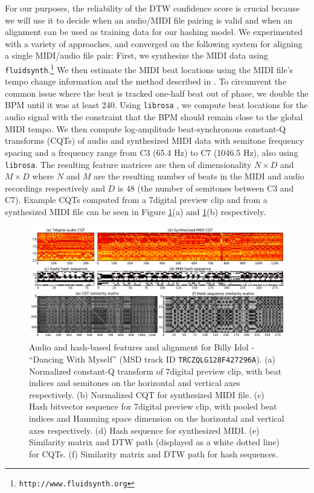 \documentclass{article}
\begin{document}
For our purposes, the reliability of the DTW confidence score is crucial because we will use it to decide when an audio/MIDI file pairing is valid and when an alignment can be used as training data for our hashing model.
We experimented with a variety of approaches, and converged on the following system for aligning a single MIDI/audio file pair:
First, we synthesize the MIDI data using \texttt{fluidsynth}.\footnote{\texttt{http://www.fluidsynth.org}}
We then estimate the MIDI beat locations using the MIDI file's tempo change information and the method described in \cite{raffel2014pretty_midi}.
To circumvent the common issue where the beat is tracked one-half beat out of phase, we double the BPM until it was at least 240.
Using \texttt{librosa} \cite{mcfee2014librosa}, we compute beat locations for the audio signal with the constraint that the BPM should remain close to the global MIDI tempo. 
We then compute log-amplitude beat-synchronous constant-Q transforms (CQTs) of audio and synthesized MIDI data with semitone frequency spacing and a frequency range from C3 (65.4 Hz) to C7 (1046.5 Hz), also using \texttt{librosa}.
The resulting feature matrices are then of dimensionality $N \times D$ and $M \times D$ where $N$ and $M$ are the resulting number of beats in the MIDI and audio recordings respectively and $D$ is $48$ (the number of semitones between C3 and C7).
Example CQTs computed from a 7digital preview clip and from a synthesized MIDI file can be seen in Figure \ref{fig:simdtw}(a) and \ref{fig:simdtw}(b) respectively.

\begin{figure}
  \includegraphics[width=\textwidth]{sims_and_dtws.pdf}
  \caption{Audio and hash-based features and alignment for Billy Idol - ``Dancing With Myself'' (MSD track ID \texttt{TRCZQLG128F427296A}).
           (a) Normalized constant-Q transform of 7digital preview clip, with beat indices and semitones on the horizontal and vertical axes respectively.
	   (b) Normalized CQT for synthesized MIDI file.
	   (c) Hash bitvector sequence for 7digital preview clip, with pooled beat indices and Hamming space dimension on the horizontal and vertical axes respectively.
	   (d) Hash sequence for synthesized MIDI.
	   (e) Similarity matrix and DTW path (displayed as a white dotted line) for CQTs.
	   (f) Similarity matrix and DTW path for hash sequences.}
  \label{fig:simdtw}
\end{figure}
\end{document}

